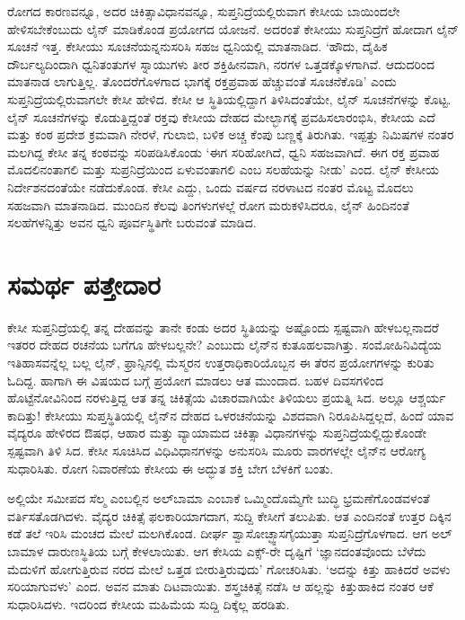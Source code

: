 
ರೋಗದ ಕಾರಣವನ್ನೂ, ಅದರ ಚಿಕಿತ್ಸಾವಿಧಾನವನ್ನೂ, ಸುಪ್ತನಿದ್ರೆಯಲ್ಲಿರುವಾಗ ಕೇಸೀಯ ಬಾಯಿಂದಲೇ ಹೇಳಿಸಬೇಕೆಂಬುದು ಲೈನ್ ಮಾಡಿಕೊಂಡ ಪ್ರಯೋಗದ ಯೋಜನೆ. ಅದರಂತೆ ಕೇಸೀಯು ಸುಪ್ತನಿದ್ರೆಗೆ ಹೋದಾಗ ಲೈನ್ ಸೂಚನೆ ಇತ್ತ. ಕೇಸೀಯು ಸೂಚನೆಯನ್ನನುಸರಿಸಿ ಸಹಜ ಧ್ವನಿಯಲ್ಲಿ ಮಾತನಾಡಿದ. ‘ಹೌದು, ದೈಹಿಕ ದೌರ್ಬಲ್ಯದಿಂದಾಗಿ ಧ್ವನಿತಂತುಗಳ ಸ್ನಾಯುಗಳು ತೀರ ಶಕ್ತಿಹೀನವಾಗಿ, ನರಗಳ ಒತ್ತಡಕ್ಕೊಳಗಾಗಿವೆ. ಆದುದರಿಂದ ಮಾತನಾಡ ಲಾಗುತ್ತಿಲ್ಲ. ತೊಂದರೆಗೊಳಗಾದ ಭಾಗಕ್ಕೆ ರಕ್ತಪ್ರವಾಹ ಹೆಚ್ಚುವಂತೆ ಸೂಚನೆಕೊಡಿ’ ಎಂದು ಸುಪ್ತನಿದ್ರೆಯಲ್ಲಿರುವಾಗಲೇ ಕೇಸೀ ಹೇಳಿದ. ಕೇಸೀ ಆ ಸ್ಥಿತಿಯಲ್ಲಿದ್ದಾಗ ತಿಳಿಸಿದಂತೆಯೇ, ಲೈನ್ ಸೂಚನೆಗಳನ್ನು ಕೊಟ್ಟ. ಲೈನ್ ಸೂಚನೆಗಳನ್ನು ಕೊಡುತ್ತಿದ್ದಂತೆ ರಕ್ತವು ಕೇಸೀಯ ದೇಹದ ಮೇಲ್ಭಾಗಕ್ಕೆ ಪ್ರವಹಿಸಲಾರಂಭಿಸಿ, ಕೇಸೀಯ ಎದೆ ಮತ್ತು ಕಂಠ ಪ್ರದೇಶ ಕ್ರಮವಾಗಿ ನೇರಳೆ, ಗುಲಾಬಿ, ಬಳಿಕ ಅಚ್ಚ ಕೆಂಪು ಬಣ್ಣಕ್ಕೆ ತಿರುಗಿತು. ಇಪ್ಪತ್ತು ನಿಮಿಷಗಳ ನಂತರ ಮಲಗಿದ್ದ ಕೇಸೀ ತನ್ನ ಕಂಠವನ್ನು ಸರಿಪಡಿಸಿಕೊಂಡು ‘ಈಗ ಸರಿಹೋಗಿದೆ, ಧ್ವನಿ ಸಹಜವಾಗಿದೆ. ಈಗ ರಕ್ತ ಪ್ರವಾಹ ಮೊದಲಿನಂತಾಗಲಿ ಮತ್ತು ಸುಪ್ರನಿದ್ರೆಯಿಂದ ಏಳುವಂತಾಗಲಿ ಎಂಬ ಸಲಹೆಯನ್ನು ನೀಡು’ ಎಂದ. ಲೈನ್ ಕೇಸೀಯ ನಿರ್ದೇಶನದಂತೆಯೇ ನಡೆದುಕೊಂಡ. ಕೇಸೀ ಎದ್ದು, ಒಂದು ವರ್ಷದ ನರಳಾಟದ ನಂತರ ಮೊಟ್ಟ ಮೊದಲು ಸಹಜವಾಗಿ ಮಾತನಾಡಿದ. ಮುಂದಿನ ಕೆಲವು ತಿಂಗಳುಗಳಲ್ಲೆ ರೋಗ ಮರುಕಳಿಸಿದರೂ, ಲೈನ್ ಹಿಂದಿನಂತೆ ಸಲಹೆಗಳನ್ನಿತ್ತು ಅವನ ಧ್ವನಿ ಪೂರ್ವಸ್ಥಿತಿಗೇ ಬರುವಂತೆ ಮಾಡಿದ.

\newpage


\section*{ಸಮರ್ಥ ಪತ್ತೇದಾರ}


ಕೇಸೀ ಸುಪ್ತನಿದ್ರೆಯಲ್ಲಿ ತನ್ನ ದೇಹವನ್ನು ತಾನೇ ಕಂಡು ಅದರ ಸ್ಥಿತಿಯನ್ನು ಅಷ್ಟೊಂದು ಸ್ಪಷ್ಟವಾಗಿ ಹೇಳಬಲ್ಲನಾದರೆ ಇತರರ ದೇಹದ ರಚನೆಯ ಬಗೆಗೂ ಹೇಳಬಲ್ಲನೇ? ಎಂಬುದು ಲೈನ್​ನ ಕುತೂಹಲವಾಗಿತ್ತು. ಸಂಮೋಹಿನಿವಿದ್ಯೆಯ ಇತಿಹಾಸವನ್ನೆಲ್ಲ ಬಲ್ಲ ಲೈನ್, ಫ್ರಾನ್ಸಿನಲ್ಲಿ ಮೆಸ್ಮರನ ಉತ್ತರಾಧಿಕಾರಿಯೊಬ್ಬನ ಈ ತೆರನ ಪ್ರಯೋಗಗಳನ್ನು ಕುರಿತು ಓದಿದ್ದ. ಹಾಗಾಗಿ ಈ ವಿಷಯದ ಬಗ್ಗೆ ಪ್ರಯೋಗ ಮಾಡಲು ಆತ ಮುಂದಾದ. ಬಹಳ ದಿವಸಗಳಿಂದ ಹೊಟ್ಟೆನೋವಿನಿಂದ ನರಳುತ್ತಿದ್ದ ಆತ ತನ್ನ ಚಿಕಿತ್ಸೆಯ ವಿಚಾರವಾಗಿಯೇ ತಿಳಿಯಲು ಪ್ರಯತ್ನಿ ಸಿದ. ಅಲ್ಲೂ ಆಶ್ಚರ್ಯ ಕಾದಿತ್ತು! ಕೇಸೀಯು ಸುಪ್ತಸ್ಥಿತಿಯಲ್ಲಿ ಲೈನ್​ನ ದೇಹದ ಒಳರಚನೆಯನ್ನು ವಿಶದವಾಗಿ ನಿರೂಪಿಸಿದ್ದಲ್ಲದೆ, ಹಿಂದೆ ಯಾವ ವೈದ್ಯರೂ ಹೇಳಿರದ ಔಷಧ, ಆಹಾರ ಮತ್ತು ವ್ಯಾಯಾಮದ ಚಿಕಿತ್ಸಾ ವಿಧಾನಗಳನ್ನು ಸುಪ್ತನಿದ್ರೆಯಲ್ಲಿದ್ದುಕೊಂಡೇ ಸ್ಪಷ್ಟವಾಗಿ ತಿಳಿ ಸಿದ. ಕೇಸೀ ಸೂಚಿಸಿದ ವಿಧಿವಿಧಾನಗಳನ್ನು ಅನುಸರಿಸಿ ಮೂರು ವಾರಗಳಲ್ಲೇ ಲೈನ್​ನ ಆರೋಗ್ಯ ಸುಧಾರಿಸಿತು. ರೋಗ ನಿವಾರಣೆಯ ಕೇಸೀಯ ಈ ಅದ್ಭುತ ಶಕ್ತಿ ಬೇಗ ಬೆಳಕಿಗೆ ಬಂತು.

ಅಲ್ಲಿಯೇ ಸಮೀಪದ ಸೆಲ್ಮ ಎಂಬಲ್ಲಿನ ಅಲ್​ಬಾಮಾ ಎಂಬಾಕೆ ಒಮ್ಮಿಂದೊಮ್ಮೆಗೇ ಬುದ್ಧಿ ಭ್ರಮಣೆಗೊಂಡವಳಂತೆ ವರ್ತಿಸತೊಡಗಿದಳು. ವೈದ್ಯರ ಚಿಕಿತ್ಸೆ ಫಲಕಾರಿಯಾಗದಾಗ, ಸುದ್ದಿ ಕೇಸೀಗೆ ತಲುಪಿತು. ಆತ ಎಂದಿನಂತೆ ಉತ್ತರ ದಿಕ್ಕಿನ ಕಡೆ ತಲೆ ಇರಿಸಿ ಮಂಚದ ಮೇಲೆ ಮಲಗಿಕೊಂಡ. ದೀರ್ಘ ಶ್ವಾಸೋಚ್ಛ್ವಾಸಗೈಯುತ್ತಾ ಸುಪ್ತನಿದ್ರೆಗೊಳಗಾದ. ಆಗ ಅಲ್​ಬಾಮಾಳ ದಾರುಣಸ್ಥಿತಿಯ ಬಗ್ಗೆ ಕೇಳಲಾಯಿತು. ಆಗ ಕೇಸಿಯ ಎಕ್ಸ್​-ರೇ ದೃಷ್ಟಿಗೆ ‘ಜ್ಞಾನದಂತವೊಂದು ಬೆಳೆದು ಮೆದುಳಿಗೆ ಹೋಗುತ್ತಿರುವ ನರದ ಮೇಲೆ ಒತ್ತಡ ಬೀರುತ್ತಿರುವುದು’ ಗೋಚರಿಸಿತು. ‘ಅದನ್ನು ಕಿತ್ತು ಹಾಕಿದರೆ ಅವಳು ಸರಿಯಾಗುವಳು’ ಎಂದ. ಅವನ ಮಾತು ದಿಟವಾಯಿತು. ಶಸ್ತ್ರಚಿಕಿತ್ಸೆ ನಡೆಸಿ ಆ ಹಲ್ಲನ್ನು ಕಿತ್ತುಹಾಕಿದ ನಂತರ ಆಕೆ ಸುಧಾರಿಸಿದಳು. ಇದರಿಂದ ಕೇಸೀಯ ಮಹಿಮೆಯ ಸುದ್ದಿ ದಿಕ್ಕೆಲ್ಲ ಹರಡಿತು.


